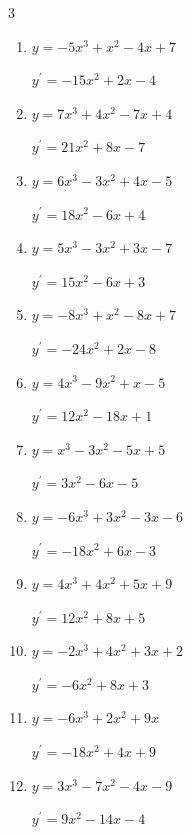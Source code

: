 \begin{multicols}{3}
\begin{enumerate}
        $\displaystyle y^{\prime}=-9x^{2}-8x$

  \item $y=-5x^{3}+x^{2}-4x+7$

        $\displaystyle y^{\prime}=-15x^{2}+2x-4$

  \item $y=7x^{3}+4x^{2}-7x+4$

        $\displaystyle y^{\prime}=21x^{2}+8x-7$

  \item $y=6x^{3}-3x^{2}+4x-5$

        $\displaystyle y^{\prime}=18x^{2}-6x+4$

  \item $y=5x^{3}-3x^{2}+3x-7$

        $\displaystyle y^{\prime}=15x^{2}-6x+3$

  \item $y=-8x^{3}+x^{2}-8x+7$

        $\displaystyle y^{\prime}=-24x^{2}+2x-8$

\columnbreak %

\resetques

  \item $y=4x^{3}-9x^{2}+x-5$

        $\displaystyle y^{\prime}=12x^{2}-18x+1$

  \item $y=x^{3}-3x^{2}-5x+5$

        $\displaystyle y^{\prime}=3x^{2}-6x-5$

  \item $y=-6x^{3}+3x^{2}-3x-6$

        $\displaystyle y^{\prime}=-18x^{2}+6x-3$

  \item $y=4x^{3}+4x^{2}+5x+9$

        $\displaystyle y^{\prime}=12x^{2}+8x+5$

  \item $y=-2x^{3}+4x^{2}+3x+2$

        $\displaystyle y^{\prime}=-6x^{2}+8x+3$

  \item $y=-6x^{3}+2x^{2}+9x$

        $\displaystyle y^{\prime}=-18x^{2}+4x+9$

  \item $y=3x^{3}-7x^{2}-4x-9$

        $\displaystyle y^{\prime}=9x^{2}-14x-4$


\end{enumerate}
\end{multicols}
